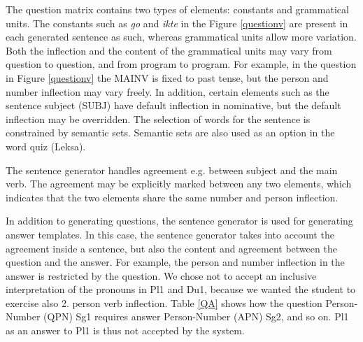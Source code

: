 \documentclass[11pt]{article}
\begin{document}
The question matrix contains two types of elements: constants and grammatical units. The constants such as \textit{go} and \textit{ikte} in the Figure \ref{questionv} are present in each generated sentence as such, whereas grammatical units allow more variation. Both the inflection and the content of the grammatical units may vary from question to question, and from program to program. For example, in the question in Figure \ref{questionv} the MAINV is fixed to past tense, but the person and number inflection may vary freely. In addition, certain elements such as the sentence subject (SUBJ) have default inflection in nominative, but the default inflection may be overridden. The selection of words for the sentence is constrained by semantic sets. Semantic sets are also used as an option in the word quiz (Leksa).
%

The sentence generator handles agreement e.g. between subject and the main verb. The agreement may be explicitly marked between any two elements, which indicates that the two elements share the same number and person inflection.

In addition to generating questions, the sentence generator is used for generating answer templates. In this case, the sentence generator takes into account the agreement inside a sentence, but also the content and agreement between the question and the answer. For example, the person and number inflection in the answer is restricted by the question. We chose not to accept an inclusive interpretation of the pronouns in Pl1 and Du1, because we wanted the student to exercise also 2. person verb inflection. Table \ref{QA} shows how the question Person-Number (QPN) Sg1 requires answer Person-Number (APN) Sg2, and so on. Pl1 as an answer to Pl1 is thus not accepted by the system.\\
\end{document}
